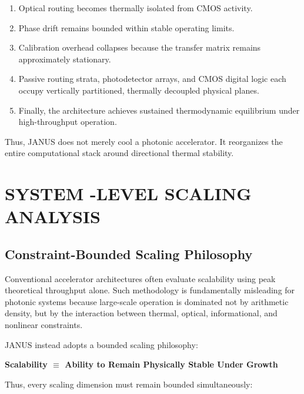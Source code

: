 \documentclass[journal]{IEEEtran}
\begin{document}
\begin{enumerate}
\item Optical routing becomes thermally isolated from CMOS activity.
\item Phase drift remains bounded within stable operating limits.
\item Calibration overhead collapses because the transfer matrix remains approximately stationary.
\item Passive routing strata, photodetector arrays, and CMOS digital logic each occupy vertically partitioned, thermally decoupled physical planes.
\item Finally, the architecture achieves sustained thermodynamic equilibrium under high-throughput operation.
\end{enumerate}

Thus, JANUS does not merely cool a photonic accelerator. It reorganizes the entire computational stack around directional thermal stability.

\section{SYSTEM -LEVEL SCALING ANALYSIS}


\subsection{\textbf{Constraint-Bounded Scaling Philosophy}}

Conventional accelerator architectures often evaluate scalability using peak theoretical throughput alone. Such methodology is fundamentally misleading for photonic systems because large-scale operation is dominated not by arithmetic density, but by the interaction between thermal, optical, informational, and nonlinear constraints.

JANUS instead adopts a bounded scaling philosophy:

\begin{center}
\textbf{Scalability $\equiv$ Ability to Remain Physically Stable Under Growth}
\end{center}

Thus, every scaling dimension must remain bounded simultaneously:

\begin{center}
\end{center}

\begin{center}
\end{center}
\end{document}
